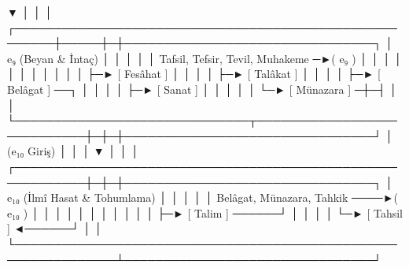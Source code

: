\documentclass[11pt,a4paper]{article}
\begin{document}
                               ▼                        │     │ │
┌───────────────────────────────────────────────────────┼─────┼─┼────────────────────────────────┐
│  e₉ (Beyan & İntaç)                                   │     │ │                                │
│  { Tafsil, Tefsir, Tevil, Muhakeme } ─►( e₉ )         │     │ │                                │
│                                         │             │     │ │                                │
│                                         ├─► [ Fesâhat ]     │ │                                │
│                                         ├─► [ Talâkat ]     │ │                                │
│                                         ├─► [ Belâgat ] ──┐ │ │                                │
│                                         ├─► [ Sanat ]     │ │ │                                │
│                                         └─► [ Münazara ] ─┼─┤ │                                │
└──────────────────────────────┬────────────────────────────┼─┼─┼────────────────────────────────┘
                               │ (e₁₀ Giriş)                │ │ │
                               ▼                            │ │ │
┌───────────────────────────────────────────────────────────┼─┼─┼────────────────────────────────┐
│  e₁₀ (İlmî Hasat & Tohumlama)                             │ │ │                                │
│  { Belâgat, Münazara, Tahkik } ────►( e₁₀ )               │ │ │                                │
│                                       │                   │ │ │                                │
│                                       ├─► [ Talim ] ──────┘ │ │                                │
│                                       └─► [ Tahsil ] ◄──────┘ │                                │
└───────────────────────────────────────────────────────────────┴────────────────────────────────┘
\end{document}
